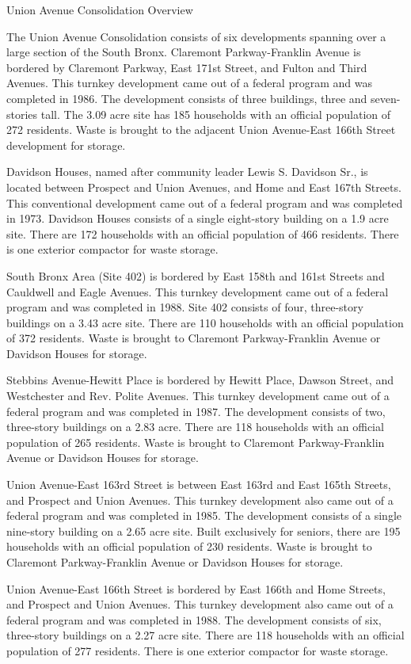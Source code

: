 Union Avenue Consolidation Overview

The Union Avenue Consolidation consists of six developments spanning over a large section of the South Bronx. Claremont Parkway-Franklin Avenue is bordered by Claremont Parkway, East 171st Street, and Fulton and Third Avenues. This turnkey development came out of a federal program and was completed in 1986. The development consists of three buildings, three and seven-stories tall. The 3.09 acre site has 185 households with an official population of 272 residents. Waste is brought to the adjacent Union Avenue-East 166th Street development for storage.

Davidson Houses, named after community leader Lewis S. Davidson Sr., is located between Prospect and Union Avenues, and Home and East 167th Streets. This conventional development came out of a federal program and was completed in 1973. Davidson Houses consists of a single eight-story building on a 1.9 acre site. There are 172 households with an official population of 466 residents. There is one exterior compactor for waste storage.

South Bronx Area (Site 402) is bordered by East 158th and 161st Streets and Cauldwell and Eagle Avenues. This turnkey development came out of a federal program and was completed in 1988. Site 402 consists of four, three-story buildings on a 3.43 acre site. There are 110 households with an official population of 372 residents. Waste is brought to Claremont Parkway-Franklin Avenue or Davidson Houses for storage. 

Stebbins Avenue-Hewitt Place is bordered by Hewitt Place, Dawson Street, and Westchester and Rev. Polite Avenues. This turnkey development came out of a federal program and was completed in 1987. The development consists of two, three-story buildings on a 2.83 acre. There are 118 households with an official population of 265 residents. Waste is brought to Claremont Parkway-Franklin Avenue or Davidson Houses for storage.

Union Avenue-East 163rd Street is between East 163rd and East 165th Streets, and Prospect and Union Avenues. This turnkey development also came out of a federal program and was completed in 1985. The development consists of a single nine-story building on a 2.65 acre site. Built exclusively for seniors, there are 195 households with an official population of 230 residents. Waste is brought to Claremont Parkway-Franklin Avenue or Davidson Houses for storage.

Union Avenue-East 166th Street is bordered by East 166th and Home Streets, and Prospect and Union Avenues. This turnkey development also came out of a federal program and was completed in 1988. The development consists of six, three-story buildings on a 2.27 acre site. There are 118 households with an official population of 277 residents. There is one exterior compactor for waste storage.